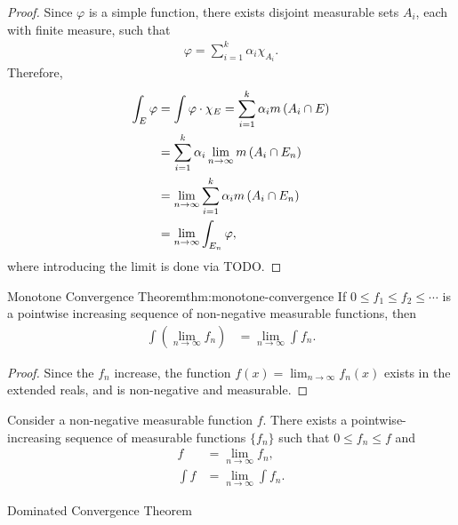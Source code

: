 \begin{proof}
    Since $\varphi$ is a simple function, there exists disjoint measurable sets $A_i$, each with finite measure, such that
    \begin{align*}
        \varphi = \sum_{i=1}^{k}\alpha_i\chi_{A_i}.
    \end{align*}
    Therefore,
    \begin{align*}
        \int_{E}\varphi &= \int\varphi \cdot \chi_{E} = \sum_{i=1}^{k}\alpha_{i}m\left(A_i \cap E\right) \\
        &= \sum_{i=1}^{k}\alpha_{i}\lim_{n\to\infty}m\left(A_i \cap E_n\right) \\
        &= \lim_{n\to\infty}\sum_{i=1}^{k}\alpha_{i}m\left(A_i \cap E_n\right) \\
        &= \lim_{n\to\infty}\int_{E_n}\varphi,
    \end{align*}
    where introducing the limit is done via {\color{red}TODO}.
\end{proof}

\begin{thm}{Monotone Convergence Theorem}{thm:monotone-convergence}\proofbreak
    If $0 \leq f_1 \leq f_2 \leq \cdots$ is a pointwise increasing sequence of non-negative measurable functions, then
    \begin{align*}
        \int\left(\lim_{n\to\infty}f_n\right) &= \lim_{n\to\infty}\int f_n.
    \end{align*}
\end{thm}

\begin{proof}
    Since the $f_n$ increase, the function $f(x) = \lim_{n\to\infty}f_n(x)$ exists in the extended reals, and is non-negative and measurable.
\end{proof}

\begin{cor}
    Consider a non-negative measurable function $f$. There exists a pointwise-increasing sequence of measurable functions $\{f_n\}$ such that $0 \leq f_n \leq f$ and
    \begin{align*}
        f &= \lim_{n\to\infty}f_n, \\
        \int f &= \lim_{n\to\infty}\int f_n.
    \end{align*}
\end{cor}

\begin{thm}
    Dominated Convergence Theorem
\end{thm}

